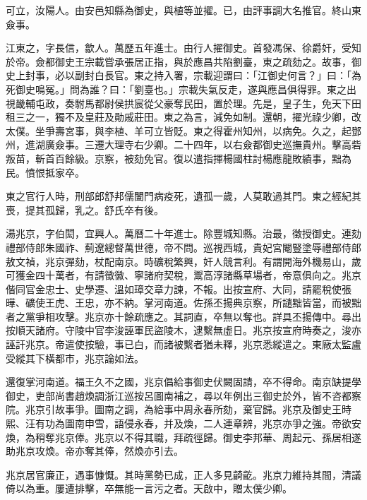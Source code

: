\begin{pinyinscope}
可立，汝陽人。由安邑知縣為御史，與植等並擢。已，由評事調大名推官。終山東僉事。

江東之，字長信，歙人。萬歷五年進士。由行人擢御史。首發馮保、徐爵奸，受知於帝。僉都御史王宗載嘗承張居正指，與於應昌共陷劉臺，東之疏劾之。故事，御史上封事，必以副封白長官。東之持入署，宗載迎謂曰：「江御史何言？」曰：「為死御史鳴冤。」問為誰？曰：「劉臺也。」宗載失氣反走，遂與應昌俱得罪。東之出視畿輔屯政，奏駙馬都尉侯拱宸從父豪奪民田，置於理。先是，皇子生，免天下田租三之一，獨不及皇莊及勛戚莊田。東之為言，減免如制。還朝，擢光祿少卿，改太僕。坐爭壽宮事，與李植、羊可立皆貶。東之得霍州知州，以病免。久之，起鄧州，進湖廣僉事。三遷大理寺右少卿。二十四年，以右僉都御史巡撫貴州。擊高砦叛苗，斬首百餘級。京察，被劾免官。復以遣指揮楊國柱討楊應龍敗績事，黜為民。憤恨抵家卒。

東之官行人時，刑部郎舒邦儒闔門病疫死，遺孤一歲，人莫敢過其門。東之經紀其喪，提其孤歸，乳之。舒氏卒有後。

湯兆京，字伯閎，宜興人。萬曆二十年進士。除豐城知縣。治最，徵授御史。連劾禮部侍郎朱國祚、薊遼總督萬世德，帝不問。巡視西城，貴妃宮閹豎塗辱禮部侍郎敖文禎，兆京彈劾，杖配南京。時礦稅繁興，奸人競言利。有謂開海外機易山，歲可獲金四十萬者，有請徵徽、寧諸府契稅，鬻高淳諸縣草場者，帝意俱向之。兆京偕同官金忠士、史學遷、溫如璋交章力諫，不報。出按宣府、大同，請罷稅使張曄、礦使王虎、王忠，亦不納。掌河南道。佐孫丕揚典京察，所譴黜皆當，而被黜者之黨爭相攻擊。兆京亦十餘疏應之。其詞直，卒無以奪也。詳具丕揚傳中。尋出按順天諸府。守陵中官李浚誣軍民盜陵木，逮繫無虛日。兆京按宣府時奏之，浚亦誣訐兆京。帝遣使按驗，事已白，而諸被繫者猶未釋，兆京悉縱遣之。東廠太監盧受縱其下橫都市，兆京論如法。

還復掌河南道。福王久不之國，兆京倡給事御史伏闕固請，卒不得命。南京缺提學御史，吏部尚書趙煥調浙江巡按呂圖南補之，尋以年例出三御史於外，皆不咨都察院。兆京引故事爭。圖南之調，為給事中周永春所劾，棄官歸。兆京及御史王時熙、汪有功為圖南申雪，語侵永春，并及煥，二人連章辨，兆京亦爭之強。帝欲安煥，為稍奪兆京俸。兆京以不得其職，拜疏徑歸。御史李邦華、周起元、孫居相遂助兆京攻煥。帝亦奪其俸，然煥亦引去。

兆京居官廉正，遇事慷慨。其時黨勢已成，正人多見齮齕。兆京力維持其間，清議倚以為重。屢遭排擊，卒無能一言污之者。天啟中，贈太僕少卿。


\end{pinyinscope}
